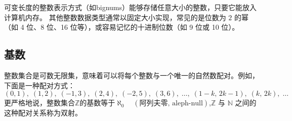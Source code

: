 可变长度的整数表示方式（如bignums）能够存储任意大小的整数，只要它能放入计算机内存。
其他整数数据类型通常以固定大小实现，常见的是位数为 $2$ 的幂（如 4 位、8 位、16 位等），或容易记忆的十进制位数（如 9 位或 10 位）。
\subsection{基数}
整数集合是可数无限集，意味着可以将每个整数与一个唯一的自然数配对。例如，下面是一种配对方式：
$$
(0,1),\; (1,2),\; (-1,3),\; (2,4),\; (-2,5),\; (3,6), \;\ldots,\; (1-k,\, 2k-1),\; (k,\, 2k), \;\ldots~
$$
更严格地说，整数集合$\mathbb{Z}$的基数等于$\aleph_0 \quad (\text{阿列夫零, aleph-null})$,$\mathbb{Z}$ 与 $\mathbb{N}$ 之间的这种配对关系称为双射。

